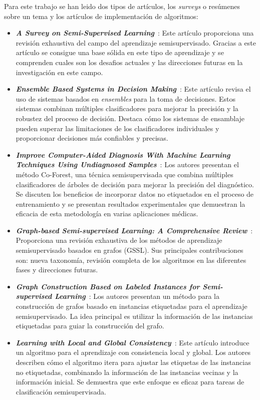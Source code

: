 Para este trabajo se han leido dos tipos de artículos, los \textit{surveys} o resúmenes sobre un tema y los artículos de implementación de algoritmos:
\begin{itemize}
	\item \textbf{\textit{A Survey on Semi-Supervised Learning}}~\cite{Engelen:semi-supervised}: Este artículo proporciona una revisión exhaustiva del campo del aprendizaje semisupervisado. Gracias a este artículo se consigue una base sólida en este tipo de aprendizaje y se comprenden cuales son los desafios actuales y las direcciones futuras en la investigación en este campo.
	\item \textbf{\textit{Ensemble Based Systems in Decision Making}}~\cite{ensembles}: Este artículo revisa el uso de sistemas basados en \textit{ensembles} para la toma de decisiones. Estos sistemas combinan múltiples clasificadores para mejorar la precisión y la robustez del proceso de decisión. Destaca cómo los sistemas de ensamblaje pueden superar las limitaciones de los clasificadores individuales y proporcionar decisiones más confiables y precisas.
	\item \textbf{\textit{Improve Computer-Aided Diagnosis With Machine Learning Techniques Using Undiagnosed Samples}}~\cite{IEEE:CoForest}: Los autores presentan el método Co-Forest, una técnica semisupervisada que combina múltiples clasificadores de árboles de decisión para mejorar la precisión del diagnóstico. Se discuten los beneficios de incorporar datos no etiquetados en el proceso de entrenamiento y se presentan resultados experimentales que demuestran la eficacia de esta metodología en varias aplicaciones médicas.
	\item \textbf{\textit{Graph-based Semi-supervised Learning: A Comprehensive Review}}~\cite{GSSL:review}: Proporciona una revisión exhaustiva de los métodos de aprendizaje semisupervisado basados en grafos (GSSL). Sus principales contribuciones son: nueva taxonomía, revisión completa de los algoritmos en las diferentes fases y direcciones futuras.
	\item \textbf{\textit{Graph Construction Based on Labeled Instances for Semi-supervised Learning}}~\cite{gbili}: Los autores presentan un método para la construcción de grafos basado en instancias etiquetadas para el aprendizaje semisupervisado. La idea principal es utilizar la información de las instancias etiquetadas para guiar la construcción del grafo.
	\item \textbf{\textit{Learning with Local and Global Consistency}}~\cite{LGC}: Este artículo introduce un algoritmo para el aprendizaje con consistencia local y global. Los autores describen cómo el algoritmo itera para ajustar las etiquetas de las instancias no etiquetadas, combinando la información de las instancias vecinas y la información inicial. Se demuestra que este enfoque es eficaz para tareas de clasificación semisupervisada.

\end{itemize}
